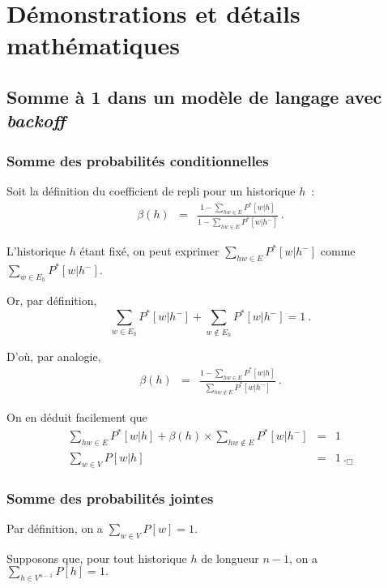 \chapter{Démonstrations et détails mathématiques}

\section{Somme à 1 dans un
modèle de langage avec \textit{backoff}}
\label{sec:somme}

\subsection{Somme des probabilités conditionnelles}

Soit la définition du coefficient de repli pour un historique $h$~:
\begin{eqnarray}
\beta(h) &=& \frac{1 - \sum_{hw \in E} P^*[w|h]}{1 - \sum_{hw \in
E}P^*[w|h^-]}~.
\end{eqnarray}

L'historique $h$ étant fixé, on peut exprimer $\sum_{hw \in E}P^*[w|h^-]$ comme
$\sum_{w \in E_h}P^*[w|h^-]$.

Or, par définition,
\begin{equation}
\sum_{w \in E_h}P^*[w|h^-] + \sum_{w \notin
E_h}P^*[w|h^-] = 1~.
\end{equation}

D'où, par analogie, 
\begin{eqnarray}
\beta(h) &=& \frac{1 - \sum_{hw \in E} P^*[w|h]}{\sum_{hw \notin E}P^*[w|h^-]}~.
\end{eqnarray}

On en déduit facilement que
\begin{eqnarray}
\sum_{hw \in E} P^*[w|h] + \beta(h)\times\sum_{hw \notin E}P^*[w|h^-] &=& 1\\
\sum_{w \in V} P[w|h] &=& 1~._\Box\label{eq:proof_h_1}
\end{eqnarray}

\subsection{Somme des probabilités jointes}


Par définition, on a $\sum_{w \in V} P[w] = 1$.

Supposons que, pour tout historique $h$ de longueur $n-1$, on a $\sum_{h \in
V^{n-1}} P[h] = 1.$

